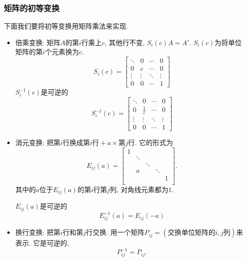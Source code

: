 \subsubsection{矩阵的初等变换}
下面我们要将初等变换用矩阵乘法来实现.

\begin{itemize}
    \item 倍乘变换: 矩阵$A$的第$i$行乘上$c$, 其他行不变, $S_i(c) A = A'$. $S_i(c)$为将单位矩阵的第$i$个元素换为$c$.
    \begin{equation}
      S_i (c) = \begin{bmatrix}
        \ddots&0&\cdots&0\\
        0&c&\cdots&0\\
        \vdots&\vdots&\ddots&\vdots\\
        0&0&\cdots&1
      \end{bmatrix}
    \end{equation}
    $S^{-1}_i (c)$是可逆的
    \begin{equation}
      S^{-1}_i (c) = \begin{bmatrix}
        \ddots&0&\cdots&0\\
        0&\frac{1}{c}&\cdots&0\\
        \vdots&\vdots&\ddots&\vdots\\
        0&0&\cdots&1
      \end{bmatrix}
    \end{equation}

    \item 消元变换: 
    把第$i$行换成$\text{第$i$行} + a \times \text{第$j$行}$. 它的形式为
    \begin{equation}
      E_{ij}(a) = \begin{bmatrix}
       1 &  &  &  & \\
        & \ddots &  &  & \\
        &  & \ddots &  & \\
        & a &  & \ddots & \\
        &  &  &  & 1\\
      \end{bmatrix}.
    \end{equation}
    其中的$a$位于$E_{ij}(a)$的第$i$行第$j$列, 对角线元素都为$1$.
    
    $E_{ij}(a)$是可逆的
    \begin{equation}
      E_{ij}^{-1}(a) = E_{ij}(-a)
    \end{equation}

    \item 换行变换:
    把第$i$行和第$j$行交换. 用一个矩阵$P_{ij} = (\text{交换单位矩阵的$i,j$列})$来表示.
    它是可逆的,
    \begin{equation}
      P^{-1}_{ij}= P_{ij}.
    \end{equation}
\end{itemize}


